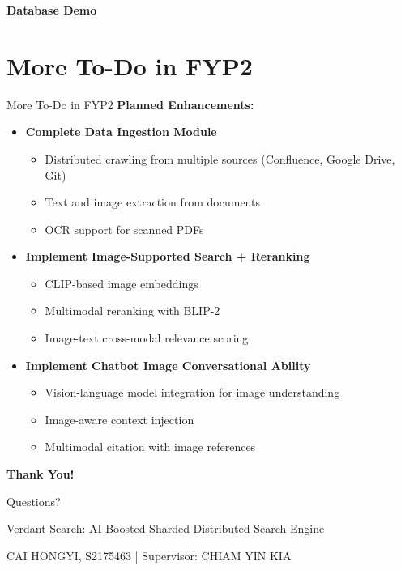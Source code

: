 \documentclass[aspectratio=169,xcolor=dvipsnames]{beamer}
\begin{document}
\begin{frame}
    \Huge{\centerline{\textbf{Database Demo}}}
\end{frame}

\section{More To-Do in FYP2}

\begin{frame}{More To-Do in FYP2}
    \Large
    \textbf{Planned Enhancements:}
    \begin{itemize}
        \item \textbf{Complete Data Ingestion Module}
        \begin{itemize}
            \large
            \item Distributed crawling from multiple sources (Confluence, Google Drive, Git)
            \item Text and image extraction from documents
            \item OCR support for scanned PDFs
        \end{itemize}
        
        \vspace{0.5em}
        \item \textbf{Implement Image-Supported Search + Reranking}
        \begin{itemize}
            \large
            \item CLIP-based image embeddings
            \item Multimodal reranking with BLIP-2
            \item Image-text cross-modal relevance scoring
        \end{itemize}
        
        \vspace{0.5em}
        \item \textbf{Implement Chatbot Image Conversational Ability}
        \begin{itemize}
            \large
            \item Vision-language model integration for image understanding
            \item Image-aware context injection
            \item Multimodal citation with image references
        \end{itemize}
    \end{itemize}
\end{frame}


\begin{frame}
    \Huge{\centerline{\textbf{Thank You!}}}
    
    \vspace{1cm}
    \Large{\centerline{Questions?}}
    
    \vspace{1cm}
    \normalsize
    \centerline{Verdant Search: AI Boosted Sharded Distributed Search Engine}
    \centerline{CAI HONGYI, S2175463 | Supervisor: CHIAM YIN KIA}
\end{frame}
\end{document}
